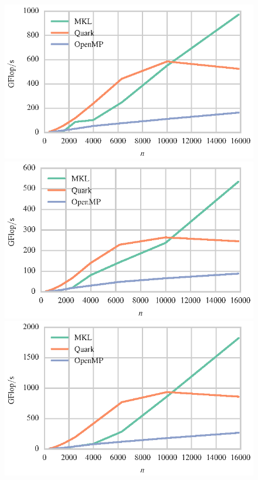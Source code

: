 \documentclass[a4paper,12pt]{article}
\begin{document}
\begin{figure}[t]
  \centering
  \includegraphics[scale=.85]{fig/knl_ram_zgetrf_weak_scaling.eps}
  \includegraphics[scale=.85]{fig/knl_ram_dgetrf_weak_scaling.eps}
  \includegraphics[scale=.85]{fig/knl_ram_cgetrf_weak_scaling.eps}

\end{figure}
\end{document}
